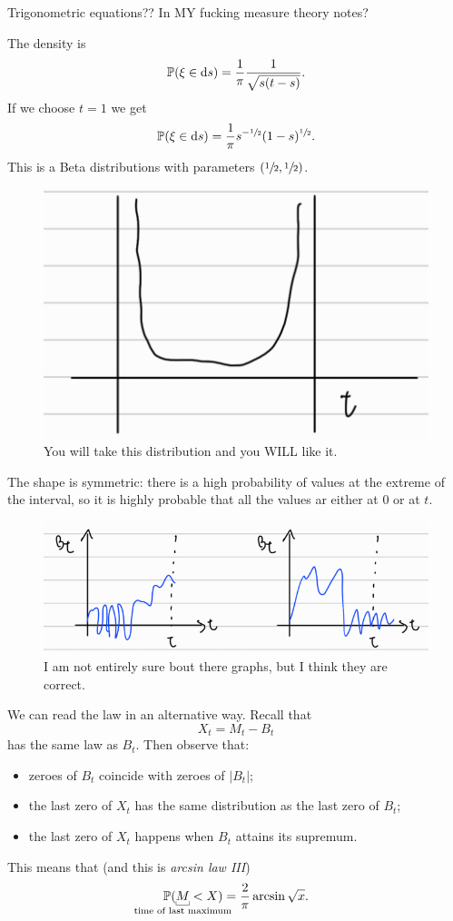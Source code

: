 \documentclass[12pt]{report}
\begin{document}
\begin{insult}
	Trigonometric equations?? In MY fucking measure theory notes? 
\end{insult}
\begin{remark}
	The density is $$\mathbb{P}(\xi\in\mathop{}\!\mathrm{d} s)=\frac{1}{\pi}\frac{1}{\sqrt{s(t-s)}}.$$
	If we choose $t=1$ we get 
	\begin{equation*}
		\mathbb{P}(\xi\in\mathop{}\!\mathrm{d} s)=\frac{1}{\pi}s^{-\sfrac{1}{2}}(1-s)^{\sfrac{1}{2}}.
	\end{equation*}
	This is a Beta distributions with parameters $(\sfrac{1}{2},\sfrac{1}{2})$.
\end{remark}
\begin{figure}[h]
	\centering
	\includegraphics[width=0.5\linewidth]{img/screenshot033}
	\caption{You will take this distribution and you WILL like it.}
	\label{fig:screenshot033}
\end{figure}
The shape is symmetric: there is a high probability of values at the extreme of the interval, so it is highly probable that all the values ar either at 0 or at $t$.
\begin{figure}[h]
	\centering
	\includegraphics[width=0.6\linewidth]{img/screenshot034}
	\caption{I am not entirely sure bout there graphs, but I think they are correct.}
	\label{fig:screenshot034}
\end{figure}
\begin{remark}
	We can read the law in an alternative way. Recall that 
	\begin{equation*}
		X_{t}=M_{t}-B_{t}
	\end{equation*}
	has the same law as $B_{t}$. Then observe that:
	\begin{itemize}
		\item zeroes of $B_{t}$ coincide with zeroes of $|B_{t}|$;
		\item the last zero of $X_{t}$ has the same distribution as the last zero of $B_{t}$;
		\item the last zero of $X_{t}$ happens when $B_{t}$ attains its supremum.
	\end{itemize}
	This means that (and this is \emph{arcsin law III})
	\begin{equation*}
		\pr(\ubracketthin{M}_{\claptext{time of last maximum}}<X)=\frac{2}{\pi}\arcsin\sqrt{x}.
	\end{equation*}
\end{remark}
\end{document}
